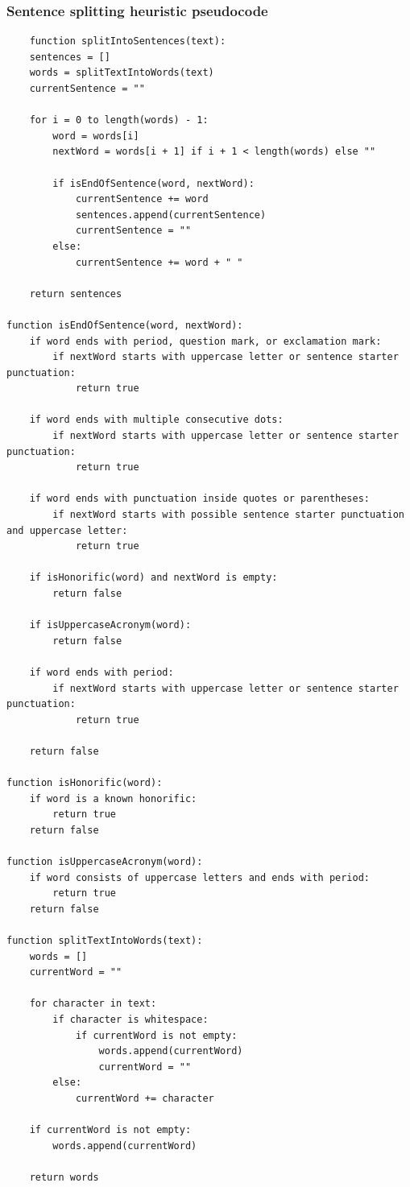 \documentclass[a4paper,12pt]{article}
\begin{document}
\subsubsection{Sentence splitting heuristic \cite{europarl} pseudocode}
\label{ann:pseudocode}
\begin{lstlisting}
    function splitIntoSentences(text):
    sentences = []
    words = splitTextIntoWords(text)
    currentSentence = ""

    for i = 0 to length(words) - 1:
        word = words[i]
        nextWord = words[i + 1] if i + 1 < length(words) else ""

        if isEndOfSentence(word, nextWord):
            currentSentence += word
            sentences.append(currentSentence)
            currentSentence = ""
        else:
            currentSentence += word + " "

    return sentences

function isEndOfSentence(word, nextWord):
    if word ends with period, question mark, or exclamation mark:
        if nextWord starts with uppercase letter or sentence starter punctuation:
            return true

    if word ends with multiple consecutive dots:
        if nextWord starts with uppercase letter or sentence starter punctuation:
            return true

    if word ends with punctuation inside quotes or parentheses:
        if nextWord starts with possible sentence starter punctuation and uppercase letter:
            return true

    if isHonorific(word) and nextWord is empty:
        return false

    if isUppercaseAcronym(word):
        return false

    if word ends with period:
        if nextWord starts with uppercase letter or sentence starter punctuation:
            return true

    return false

function isHonorific(word):
    if word is a known honorific:
        return true
    return false

function isUppercaseAcronym(word):
    if word consists of uppercase letters and ends with period:
        return true
    return false

function splitTextIntoWords(text):
    words = []
    currentWord = ""
    
    for character in text:
        if character is whitespace:
            if currentWord is not empty:
                words.append(currentWord)
                currentWord = ""
        else:
            currentWord += character
    
    if currentWord is not empty:
        words.append(currentWord)
    
    return words
\end{lstlisting}
\end{document}
